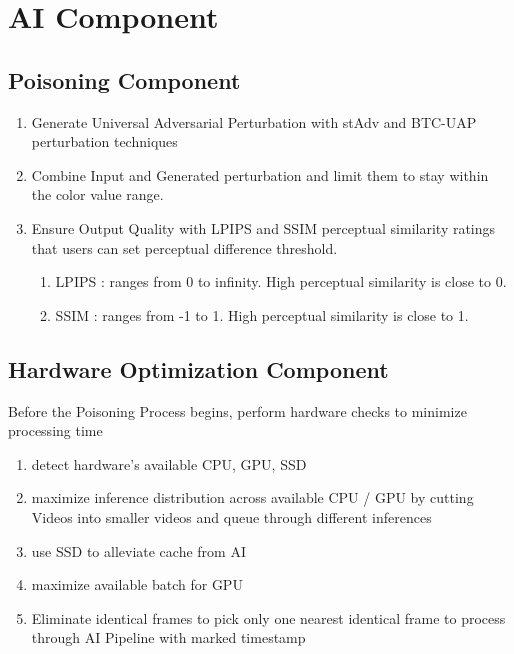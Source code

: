 \section{AI Component}
\label{section:ai-component}

\subsection{Poisoning Component}
\label{subsection:poisoning-component}
\begin{enumerate}
    \item Generate Universal Adversarial Perturbation with stAdv and BTC-UAP perturbation techniques
    \item Combine Input and Generated perturbation and limit them to stay within the color value range.
    \item Ensure Output Quality with LPIPS and SSIM perceptual similarity ratings that users can set perceptual difference threshold.
    \begin{enumerate}
        \item LPIPS : ranges from 0 to infinity. High perceptual similarity is close to 0.
        \item SSIM : ranges from -1 to 1. High perceptual similarity is close to 1.
    \end{enumerate}
\end{enumerate}

\subsection{Hardware Optimization Component}
\label{subsection:hardware-optimization-component}
Before the Poisoning Process begins, perform hardware checks to minimize processing time
\begin{enumerate}
    \item detect hardware’s available CPU, GPU, SSD
    \item maximize inference distribution across available CPU / GPU by cutting Videos into smaller videos and queue through different inferences
    \item use SSD to alleviate cache from AI
    \item maximize available batch for GPU
    \item Eliminate identical frames to pick only one nearest identical frame to process through AI Pipeline with marked timestamp
\end{enumerate}
